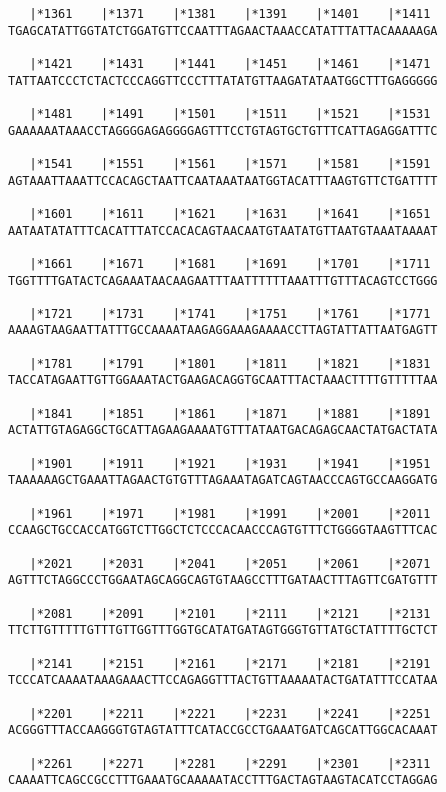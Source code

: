 \documentclass{article}
\begin{document}
\begin{Verbatim}
   |*1361    |*1371    |*1381    |*1391    |*1401    |*1411 
TGAGCATATTGGTATCTGGATGTTCCAATTTAGAACTAAACCATATTTATTACAAAAAGA
  
   |*1421    |*1431    |*1441    |*1451    |*1461    |*1471 
TATTAATCCCTCTACTCCCAGGTTCCCTTTATATGTTAAGATATAATGGCTTTGAGGGGG
  
   |*1481    |*1491    |*1501    |*1511    |*1521    |*1531 
GAAAAAATAAACCTAGGGGAGAGGGGAGTTTCCTGTAGTGCTGTTTCATTAGAGGATTTC
  
   |*1541    |*1551    |*1561    |*1571    |*1581    |*1591 
AGTAAATTAAATTCCACAGCTAATTCAATAAATAATGGTACATTTAAGTGTTCTGATTTT
  
   |*1601    |*1611    |*1621    |*1631    |*1641    |*1651 
AATAATATATTTCACATTTATCCACACAGTAACAATGTAATATGTTAATGTAAATAAAAT
  
   |*1661    |*1671    |*1681    |*1691    |*1701    |*1711 
TGGTTTTGATACTCAGAAATAACAAGAATTTAATTTTTTAAATTTGTTTACAGTCCTGGG
  
   |*1721    |*1731    |*1741    |*1751    |*1761    |*1771 
AAAAGTAAGAATTATTTGCCAAAATAAGAGGAAAGAAAACCTTAGTATTATTAATGAGTT
  
   |*1781    |*1791    |*1801    |*1811    |*1821    |*1831 
TACCATAGAATTGTTGGAAATACTGAAGACAGGTGCAATTTACTAAACTTTTGTTTTTAA
  
   |*1841    |*1851    |*1861    |*1871    |*1881    |*1891 
ACTATTGTAGAGGCTGCATTAGAAGAAAATGTTTATAATGACAGAGCAACTATGACTATA
  
   |*1901    |*1911    |*1921    |*1931    |*1941    |*1951 
TAAAAAAGCTGAAATTAGAACTGTGTTTAGAAATAGATCAGTAACCCAGTGCCAAGGATG
  
   |*1961    |*1971    |*1981    |*1991    |*2001    |*2011 
CCAAGCTGCCACCATGGTCTTGGCTCTCCCACAACCCAGTGTTTCTGGGGTAAGTTTCAC
  
   |*2021    |*2031    |*2041    |*2051    |*2061    |*2071 
AGTTTCTAGGCCCTGGAATAGCAGGCAGTGTAAGCCTTTGATAACTTTAGTTCGATGTTT
  
   |*2081    |*2091    |*2101    |*2111    |*2121    |*2131 
TTCTTGTTTTTGTTTGTTGGTTTGGTGCATATGATAGTGGGTGTTATGCTATTTTGCTCT
  
   |*2141    |*2151    |*2161    |*2171    |*2181    |*2191 
TCCCATCAAAATAAAGAAACTTCCAGAGGTTTACTGTTAAAAATACTGATATTTCCATAA
  
   |*2201    |*2211    |*2221    |*2231    |*2241    |*2251 
ACGGGTTTACCAAGGGTGTAGTATTTCATACCGCCTGAAATGATCAGCATTGGCACAAAT
  
   |*2261    |*2271    |*2281    |*2291    |*2301    |*2311 
CAAAATTCAGCCGCCTTTGAAATGCAAAAATACCTTTGACTAGTAAGTACATCCTAGGAG
  

\end{Verbatim}
\end{document}
